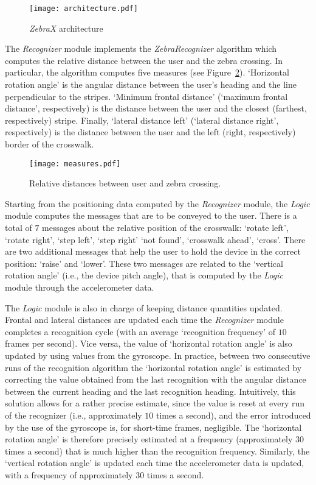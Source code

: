 \documentclass{article}
\newcommand{\recognizer}{\emph{Recognizer}}
\newcommand{\logic}{\emph{Logic}}
\newcommand{\zebra}{\emph{ZebraX}}
\begin{document}
\begin{figure}[t!]
	\centering
		\texttt{[image: architecture.pdf]}
	\caption[]{\zebra{} architecture}
	\label{fig:architecture}
\end{figure}

The \recognizer{} module implements the \emph{ZebraRecognizer} algorithm \cite{AhmetovicICPR2014} which computes the relative distance between the user and the zebra crossing.
In particular, the algorithm computes five measures (see Figure~\ref{fig:distances}).
`Horizontal rotation angle' is the angular distance between the user's heading and the line perpendicular to the stripes.
`Minimum frontal distance' (`maximum frontal distance', respectively) is the distance between the user and the closest (farthest, respectively) stripe.
Finally, `lateral distance left' (`lateral distance right', respectively) is the distance between the user and the left (right, respectively) border of the crosswalk. 

\begin{figure}[t!]
	\centering
		\texttt{[image: measures.pdf]}
	\caption[]{Relative distances between user and zebra crossing.}
	\label{fig:distances}
\end{figure}

Starting from the positioning data computed by the \recognizer{} module, the \logic{} module computes the messages that are to be conveyed to the user.
There is a total of $7$ messages about the relative position of the crosswalk: `rotate left', `rotate right', `step left', `step right' `not found', `crosswalk ahead', `cross'.
There are two additional messages that help the user to hold the device in the correct position: `raise' and `lower'. These two messages are related to the `vertical rotation angle' (i.e., the device pitch angle), that is computed by the \logic{} module through the accelerometer data.

The \logic{} module is also in charge of keeping distance quantities updated.
Frontal and lateral distances are updated each time the \recognizer{} module completes a recognition cycle (with an average `recognition frequency' of $10$ frames per second).
Vice versa, the value of `horizontal rotation angle' is also updated by using values from the gyroscope. In practice, between two consecutive runs of the recognition algorithm the `horizontal rotation angle' is estimated by correcting the value obtained from the last recognition with the angular distance between the current heading and the last recognition heading.
Intuitively, this solution allows for a rather precise estimate, since the value is reset at every run of the recognizer (i.e., approximately $10$ times a second), and the error introduced by the use of the gyroscope is, for short-time frames, negligible.
The `horizontal rotation angle' is therefore precisely estimated at a frequency (approximately $30$ times a second) that is much higher than the recognition frequency.
Similarly, the `vertical rotation angle' is updated each time the accelerometer data is updated, with a frequency of approximately $30$ times a second.
\end{document}
